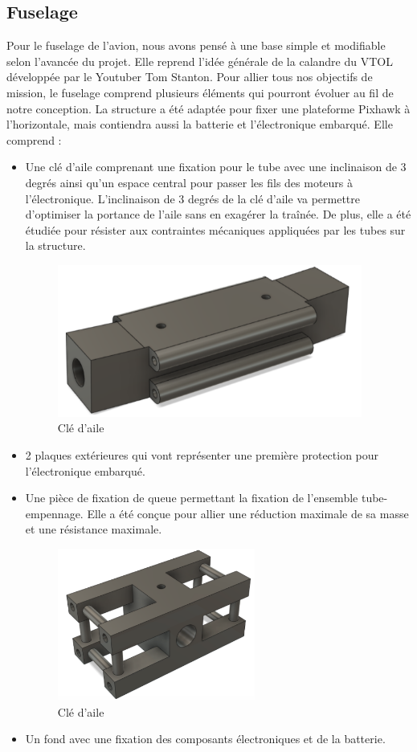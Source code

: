 \documentclass[a4paper,12pt,french]{report}
\begin{document}
\subsection{Fuselage}

Pour le fuselage de l’avion, nous avons pensé à une base simple et modifiable selon l’avancée du projet. Elle reprend l’idée générale de la calandre du VTOL développée par le Youtuber Tom Stanton. Pour allier tous nos objectifs de mission, le fuselage  comprend plusieurs éléments qui pourront évoluer au fil de notre conception. La structure a été adaptée pour fixer une plateforme Pixhawk à l’horizontale, mais contiendra aussi la batterie et l’électronique embarqué. Elle comprend :

\begin{itemize}
    \item Une clé d’aile comprenant une fixation pour le tube avec une inclinaison de 3 degrés ainsi qu’un espace central pour  passer les fils des moteurs à l'électronique. L'inclinaison de 3 degrés de la clé d'aile va permettre d’optimiser la portance de l’aile sans en exagérer la traînée. De plus, elle a été étudiée pour résister aux contraintes mécaniques appliquées par les tubes sur la structure.
          \begin{figure}[h]
              \centering
              \includegraphics[height=5cm]{figures/cle.png}
              \caption{Clé d'aile}
          \end{figure}
    \item 2 plaques extérieures qui vont représenter une première protection pour l’électronique embarqué.
    \item Une pièce de fixation de queue permettant la fixation de l’ensemble tube-empennage. Elle a été conçue pour allier une réduction maximale de sa masse et une résistance maximale.
          \begin{figure}[h]
              \centering
              \includegraphics[height=5cm]{figures/arr.png}
              \caption{Clé d'aile}
          \end{figure}
          \newpage
    \item Un fond avec une fixation des composants électroniques et de la batterie.
\end{itemize}
\end{document}
